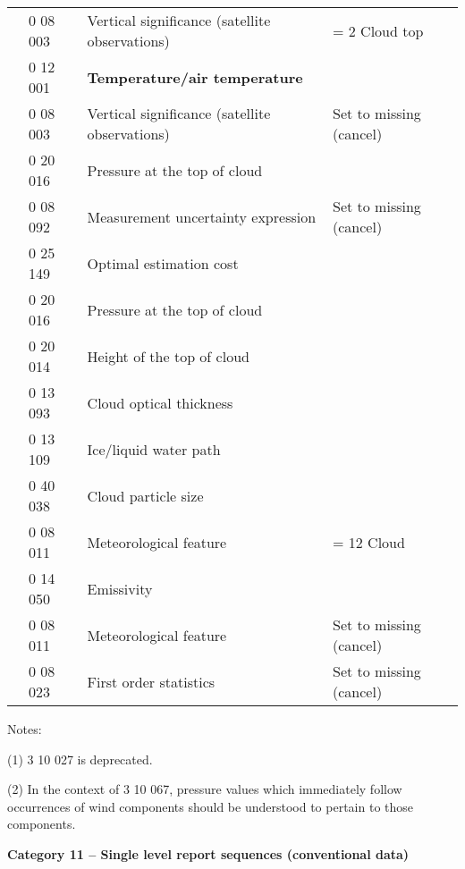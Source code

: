 \begin{longtable}[]{@{}llll@{}}
& 0 08 003 & Vertical significance (satellite observations) & = 2 Cloud top\tabularnewline
& 0 12 001 & \textbf{Temperature/air temperature} &\tabularnewline
& 0 08 003 & Vertical significance (satellite observations) & Set to missing (cancel)\tabularnewline
& 0 20 016 & Pressure at the top of cloud &\tabularnewline
& 0 08 092 & Measurement uncertainty expression & Set to missing (cancel)\tabularnewline
& 0 25 149 & Optimal estimation cost &\tabularnewline
& 0 20 016 & Pressure at the top of cloud &\tabularnewline
& 0 20 014 & Height of the top of cloud &\tabularnewline
& 0 13 093 & Cloud optical thickness &\tabularnewline
& 0 13 109 & Ice/liquid water path &\tabularnewline
& 0 40 038 & Cloud particle size &\tabularnewline
& 0 08 011 & Meteorological feature & = 12 Cloud\tabularnewline
& 0 14 050 & Emissivity &\tabularnewline
& 0 08 011 & Meteorological feature & Set to missing (cancel)\tabularnewline
& 0 08 023 & First order statistics & Set to missing (cancel)\tabularnewline
\bottomrule
\end{longtable}

Notes:

(1) 3 10 027 is deprecated.

(2) In the context of 3 10 067, pressure values which immediately follow occurrences of wind components should be understood to pertain to those components.

\textbf{Category 11 -- Single level report sequences (conventional data)}


